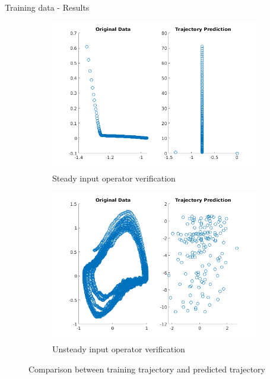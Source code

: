 \documentclass{beamer}
\begin{document}
\begin{frame}{Training data - Results}
    \begin{figure}
        \centering
        \begin{subfigure}[b]{0.45\textwidth}
            \centering
            \includegraphics[width=\textwidth]{Steady_Verification.png}
            \caption{Steady input operator verification}
            \label{fig:steady_verify}
        \end{subfigure}
        \hfill
        \begin{subfigure}[b]{0.45\textwidth}
            \centering
            \includegraphics[width=\textwidth]{Unsteady_Verification.png}
            \caption{Unsteady input operator verification}
            \label{fig:unsteady_verify}
        \end{subfigure}
        \caption{Comparison between training trajectory and predicted trajectory}
    \end{figure}
\end{frame}
\end{document}

